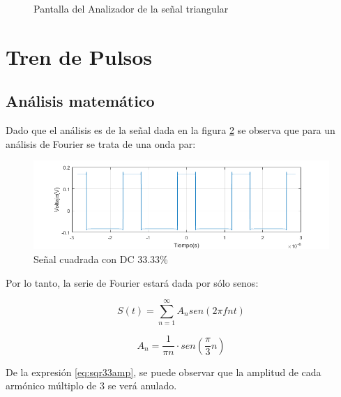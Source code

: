     \begin{figure}[ht]
        \begin{center}
            \caption{Pantalla del Analizador de la señal triangular}
            \label{fig:ansr,tri}
        \end{center}
    \end{figure}

\section{Tren de Pulsos}
    \subsection{Análisis matemático}

    Dado que el análisis es de la señal dada en la figura \ref{fig:2,3,1}
    se observa que para un análisis de Fourier se trata de una onda
    par:

    \begin{figure}[ht]
        \begin{center}
            \includegraphics[width=\linewidth]{contenido/img/sig_sqr33.png}
            \caption{Señal cuadrada con DC 33.33\%}
            \label{fig:2,3,1}
        \end{center}
    \end{figure}

    Por lo tanto, la serie de Fourier estará dada por sólo senos:

    \begin{equation}
        S(t) = \sum_{n=1}^{\infty} A_{n} sen(2 \pi f n t)
        \label{eq:sqr33}
    \end{equation}

    \begin{equation}
        A_{n} =\frac{1}{\pi n} \cdot sen(\frac{\pi}{3}n)
        \label{eq:sqr33amp}
    \end{equation}

    De la expresión	\ref{eq:sqr33amp}, se puede observar que la amplitud de cada armónico
    múltiplo de 3 se verá anulado.
    
